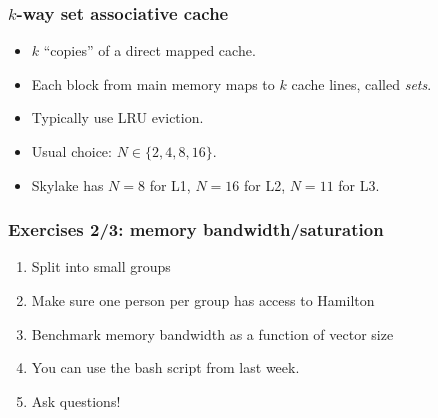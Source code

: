 \documentclass[dvipsnames,presentation,aspectratio=169,14pt]{beamer}
\begin{document}
\begin{frame}
  \frametitle{$k$-way set associative cache}
  \begin{itemize}[itemsep=8pt]
  \item $k$ ``copies'' of a direct mapped cache.
  \item Each block from main memory maps to $k$ cache lines, called \emph{sets}.
  \item Typically use LRU eviction.
  \item Usual choice: $N \in \{2, 4, 8, 16\}$.
  \item Skylake has $N = 8$ for L1, $N = 16$ for L2, $N = 11$
    for L3.
  \end{itemize}
\end{frame}

\begin{frame}
  \frametitle{Exercises 2/3: memory bandwidth/saturation}
  \begin{enumerate}[itemsep=8pt]
  \item Split into small groups
  \item Make sure one person per group has access to Hamilton
  \item Benchmark memory bandwidth as a function of vector size
  \item You can use the bash script from last week.
  \item Ask questions!
  \end{enumerate}
\end{frame}
\end{document}
